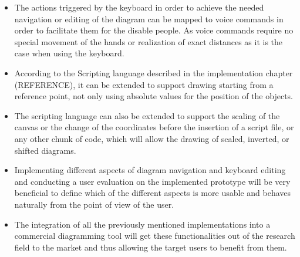 \begin{itemize}
\item The actions triggered by the keyboard in order to achieve the needed navigation or editing of the diagram can be mapped to voice commands in order to facilitate them for the disable people. As voice commands require no special movement of the hands or realization of exact distances as it is the case when using the keyboard.

\item According to the Scripting language described in the implementation chapter (REFERENCE), it can be extended to support drawing starting from a reference point, not only using absolute values for the position of the objects.

\item The scripting language can also be extended to support the scaling of the canvas or the change of the coordinates before the insertion of a script file, or any other chunk of code, which will allow the drawing of scaled, inverted, or shifted diagrams.

\item Implementing different aspects of diagram navigation and keyboard editing and conducting a user evaluation on the implemented prototype will be very beneficial to define which of the different aspects is more usable and behaves naturally from the point of view of the user.

\item The integration of all the previously mentioned implementations into a commercial diagramming tool will get these functionalities out of the research field to the market and thus allowing the target users to benefit from them.
\end{itemize}
